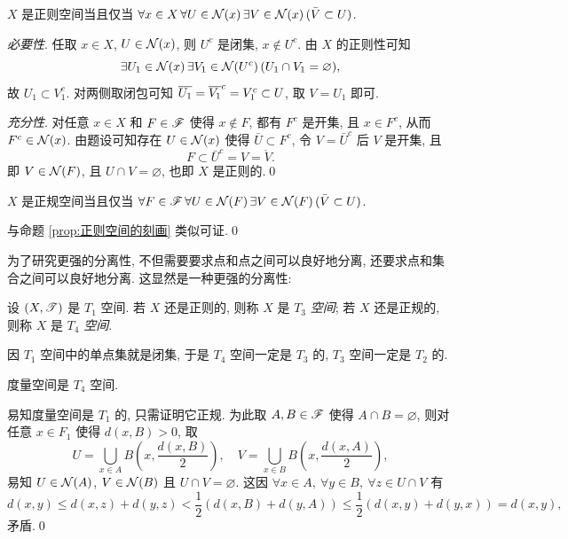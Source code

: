     \begin{Proposition}[正则空间的刻画]\label{prop:正则空间的刻画}
        $ X $ 是正则空间当且仅当 $ \forall x\in X\,\forall U\in\CN(x)\,\exists V\in\CN(x)\,(\bar{V}\subset U) $.
    \end{Proposition}
    \begin{Proof}
        \textsl{必要性}. 任取 $ x\in X $, $ U\in\CN(x) $, 则 $ U^c $ 是闭集, $ x\notin U^c $. 由 $ X $ 的正则性可知
        \[
            \exists U_1\in\CN(x)\,\exists V_1\in\CN(U^c)\,(U_1\cap V_1=\varnothing),
        \]
        故 $ U_1\subset V_1^c $. 对两侧取闭包可知 $ \baro{U_1}=\baro{V_1}^c=V_1^c\subset U $, 取 $ V=U_1 $ 即可.
        
        \textsl{充分性}. 对任意 $ x\in X $ 和 $ F\in\SF $ 使得 $ x\notin F $, 都有 $ F^c $ 是开集, 且 $ x\in F^c $, 从而 $ F^c\in\CN(x) $. 由题设可知存在 $ U\in\CN(x) $ 使得 $ \bar{U}\subset F^c $, 令 $ V=\bar{U}^c $ 后 $ V $ 是开集, 且
        \[
            F\subset\bar{U}^c=V=\mathring{V}.
        \]
        即 $ V\in\CN(F) $, 且 $ U\cap V=\varnothing $, 也即 $ X $ 是正则的.\qed
    \end{Proof}

    \begin{Proposition}[正规空间的刻画]
        $ X $ 是正规空间当且仅当 $ \forall F\in\SF\,\forall U\in\CN(F)\,\exists V\in\CN(F)\,(\bar{V}\subset U) $.
    \end{Proposition}
    \begin{Proof}
        与命题 \ref{prop:正则空间的刻画} 类似可证.\qed
    \end{Proof}

    为了研究更强的分离性, 不但需要要求点和点之间可以良好地分离, 还要求点和集合之间可以良好地分离. 这显然是一种更强的分离性:

    \begin{Definition}[$ T_3,T_4 $公理]
        设 $ (X,\ST) $ 是 $ T_1 $ 空间. 若 $ X $ 还是正则的, 则称 $ X $ 是 $ T_3 $ \emph{空间}; 若 $ X $ 还是正规的, 则称 $ X $ 是 $ T_4 $ \emph{空间}.
    \end{Definition}

    因 $ T_1 $ 空间中的单点集就是闭集, 于是 $ T_4 $ 空间一定是 $ T_3 $ 的, $ T_3 $ 空间一定是 $ T_2 $ 的.

    \begin{Theorem}
        度量空间是 $ T_4 $ 空间.
    \end{Theorem}
    \begin{Proof}
        易知度量空间是 $ T_1 $ 的, 只需证明它正规. 为此取 $ A, B\in\SF $ 使得 $ A\cap B=\varnothing $, 则对任意 $ x\in F_1 $ 使得 $ d(x,B)>0 $, 取
        \[
            U=\bigcup_{x\in A}B\left(x,\frac{d(x,B)}{2}\right),\quad V=\bigcup_{x\in B}B\left(x,\frac{d(x,A)}{2}\right),
        \]
        易知 $ U\in\CN(A) $, $ V\in\CN(B) $ 且 $ U\cap V=\varnothing $. 这因 $ \forall x\in A,\ \forall y\in B,\ \forall z\in U\cap V $ 有
        \[
            d(x,y)\leqslant d(x,z)+d(y,z)<\frac{1}{2}(d(x,B)+d(y,A))\leqslant\frac{1}{2}(d(x,y)+d(y,x))=d(x,y),
        \]
        矛盾.\qed
    \end{Proof}

